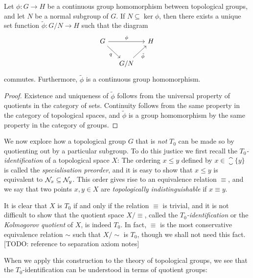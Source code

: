 \documentclass[article, a4paper, 11pt, oneside]{memoir}
\numberwithin{equation}{chapter}
\begin{document}
\begin{proposition}
    Let $\phi \colon G \to H$ be a continuous group homomorphism between topological groups, and let $N$ be a normal subgroup of $G$. If $N \subseteq \ker\phi$, then there exists a unique set function $\tilde{\phi} \colon G/N \to H$ such that the diagram
    \begin{equation*}
        \begin{tikzcd}[column sep=small]
            G
                \ar[rr, "\phi"]
                \ar[dr, "q", swap]
            && H
            \\
            & G/N
                \ar[ur, "\tilde{\phi}", swap]
        \end{tikzcd}
    \end{equation*}
    commutes. Furthermore, $\tilde{\phi}$ is a continuous group homomorphism.
\end{proposition}

\begin{proof}
    Existence and uniqueness of $\tilde{\phi}$ follows from the universal property of quotients in the category of sets. Continuity follows from the same property in the category of topological spaces, and $\tilde{\phi}$ is a group homomorphism by the same property in the category of groups.
\end{proof}

We now explore how a topological group $G$ that is \emph{not} $T_0$ can be made so by quotienting out by a particular subgroup. To do this justice we first recall the \emph{$T_0$-identification} of a topological space $X$: The ordering $x \leq y$ defined by $x \in \closure{\{y\}}$ is called the \emph{specialisation preorder}, and it is easy to show that $x \leq y$ is equivalent to $\mathcal{N}_{x} \subseteq \mathcal{N}_{y}$. This order gives rise to an equivalence relation $\equiv$, and we say that two points $x,y \in X$ are \emph{topologically indistinguishable} if $x \equiv y$.

It is clear that $X$ is $T_0$ if and only if the relation $\equiv$ is trivial, and it is not difficult to show that the quotient space $X/{\equiv}$, called the \emph{$T_0$-identification} or the \emph{Kolmogorov quotient} of $X$, is indeed $T_0$. In fact, $\equiv$ is the most conservative equivalence relation $\sim$ such that $X/{\sim}$ is $T_0$, though we shall not need this fact. [TODO: reference to separation axiom notes]

When we apply this construction to the theory of topological groups, we see that the $T_0$-identification can be understood in terms of quotient groups:
\end{document}
